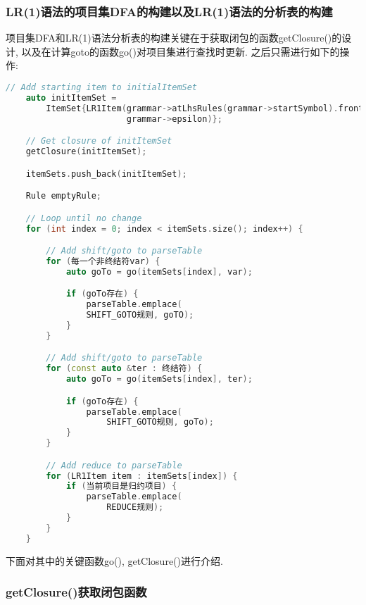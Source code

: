 \subsubsection{LR(1)语法的项目集DFA的构建以及LR(1)语法的分析表的构建}
项目集DFA和LR(1)语法分析表的构建关键在于获取闭包的函数getClosure()的设计,
以及在计算goto的函数go()对项目集进行查找时更新. 之后只需进行如下的操作:
\begin{lstlisting}[language=c++]
    // Add starting item to initialItemSet
    auto initItemSet =
        ItemSet{LR1Item(grammar->atLhsRules(grammar->startSymbol).front(), 0,
                        grammar->epsilon)};

    // Get closure of initItemSet
    getClosure(initItemSet);

    itemSets.push_back(initItemSet);

    Rule emptyRule;

    // Loop until no change
    for (int index = 0; index < itemSets.size(); index++) {

        // Add shift/goto to parseTable
        for (每一个非终结符var) {
            auto goTo = go(itemSets[index], var);

            if (goTo存在) {
                parseTable.emplace(
                SHIFT_GOTO规则, goTO);
            }
        }

        // Add shift/goto to parseTable
        for (const auto &ter : 终结符) {
            auto goTo = go(itemSets[index], ter);

            if (goTo存在) {
                parseTable.emplace(
                    SHIFT_GOTO规则, goTo);
            }
        }

        // Add reduce to parseTable
        for (LR1Item item : itemSets[index]) {
            if (当前项目是归约项目) {
                parseTable.emplace(
                    REDUCE规则);
            }
        }
    }
\end{lstlisting}

下面对其中的关键函数go(), getClosure()进行介绍.
\subsubsection{getClosure()获取闭包函数}

